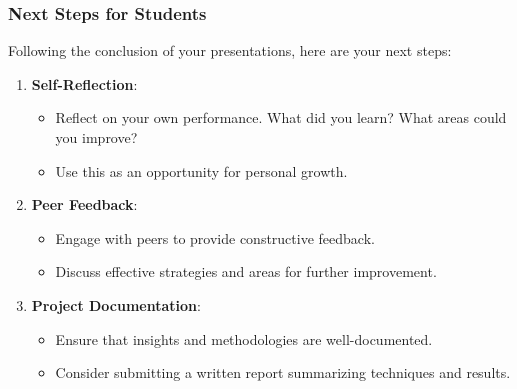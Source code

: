 \documentclass[aspectratio=169]{beamer}
\begin{document}
\begin{frame}[fragile]
    \frametitle{Next Steps for Students}
    
    Following the conclusion of your presentations, here are your next steps:
    
    \begin{enumerate}
        \item \textbf{Self-Reflection}:
        \begin{itemize}
            \item Reflect on your own performance. What did you learn? What areas could you improve?
            \item Use this as an opportunity for personal growth.
        \end{itemize}
        
        \item \textbf{Peer Feedback}:
        \begin{itemize}
            \item Engage with peers to provide constructive feedback.
            \item Discuss effective strategies and areas for further improvement.
        \end{itemize}
        
        \item \textbf{Project Documentation}:
        \begin{itemize}
            \item Ensure that insights and methodologies are well-documented.
            \item Consider submitting a written report summarizing techniques and results.
        \end{itemize}
    \end{enumerate}
\end{frame}
\end{document}
